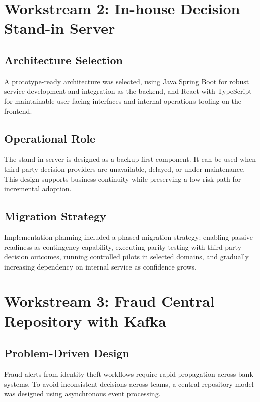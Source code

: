 \section{Workstream 2: In-house Decision Stand-in Server}

\subsection{Architecture Selection}

A prototype-ready architecture was selected, using Java Spring Boot for robust service development and integration as the backend, and React with TypeScript for maintainable user-facing interfaces and internal operations tooling on the frontend.

\subsection{Operational Role}

The stand-in server is designed as a backup-first component. It can be used when third-party decision providers are unavailable, delayed, or under maintenance. This design supports business continuity while preserving a low-risk path for incremental adoption.

\subsection{Migration Strategy}

Implementation planning included a phased migration strategy: enabling passive readiness as contingency capability, executing parity testing with third-party decision outcomes, running controlled pilots in selected domains, and gradually increasing dependency on internal service as confidence grows.

\section{Workstream 3: Fraud Central Repository with Kafka}

\subsection{Problem-Driven Design}

Fraud alerts from identity theft workflows require rapid propagation across bank systems. To avoid inconsistent decisions across teams, a central repository model was designed using asynchronous event processing.


